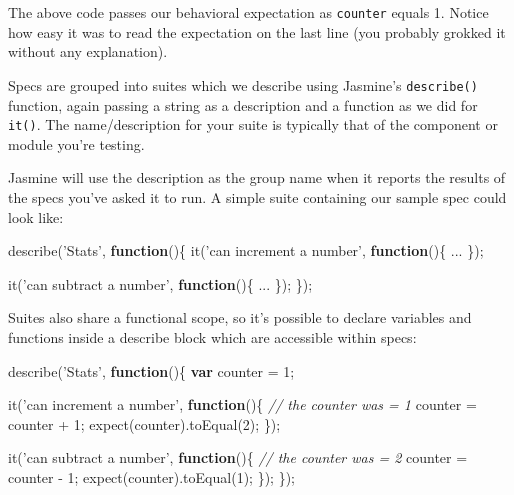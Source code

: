\documentclass[9pt]{book}
\newenvironment{Shaded}{}{}
\newcommand{\KeywordTok}[1]{\textcolor[rgb]{0.00,0.44,0.13}{\textbf{{#1}}}}
\newcommand{\DecValTok}[1]{\textcolor[rgb]{0.25,0.63,0.44}{{#1}}}
\newcommand{\StringTok}[1]{\textcolor[rgb]{0.25,0.44,0.63}{{#1}}}
\newcommand{\CommentTok}[1]{\textcolor[rgb]{0.38,0.63,0.69}{\textit{{#1}}}}
\newcommand{\FunctionTok}[1]{\textcolor[rgb]{0.02,0.16,0.49}{{#1}}}
\newcommand{\NormalTok}[1]{{#1}}
\begin{document}
The above code passes our behavioral expectation as \texttt{counter}
equals 1. Notice how easy it was to read the expectation on the last
line (you probably grokked it without any explanation).

Specs are grouped into suites which we describe using Jasmine's
\texttt{describe()} function, again passing a string as a description
and a function as we did for \texttt{it()}. The name/description for
your suite is typically that of the component or module you're testing.

Jasmine will use the description as the group name when it reports the
results of the specs you've asked it to run. A simple suite containing
our sample spec could look like:

\begin{Shaded}
\begin{Highlighting}[]
\FunctionTok{describe}\NormalTok{(}\StringTok{'Stats'}\NormalTok{, }\KeywordTok{function}\NormalTok{()\{}
    \FunctionTok{it}\NormalTok{(}\StringTok{'can increment a number'}\NormalTok{, }\KeywordTok{function}\NormalTok{()\{}
        \NormalTok{...}
    \NormalTok{\});}

    \FunctionTok{it}\NormalTok{(}\StringTok{'can subtract a number'}\NormalTok{, }\KeywordTok{function}\NormalTok{()\{}
        \NormalTok{...}
    \NormalTok{\});}
\NormalTok{\});}
\end{Highlighting}
\end{Shaded}

Suites also share a functional scope, so it's possible to declare
variables and functions inside a describe block which are accessible
within specs:

\begin{Shaded}
\begin{Highlighting}[]
\FunctionTok{describe}\NormalTok{(}\StringTok{'Stats'}\NormalTok{, }\KeywordTok{function}\NormalTok{()\{}
    \KeywordTok{var} \NormalTok{counter = }\DecValTok{1}\NormalTok{;}

    \FunctionTok{it}\NormalTok{(}\StringTok{'can increment a number'}\NormalTok{, }\KeywordTok{function}\NormalTok{()\{}
        \CommentTok{// the counter was = 1}
        \NormalTok{counter = counter + }\DecValTok{1}\NormalTok{;}
        \FunctionTok{expect}\NormalTok{(counter).}\FunctionTok{toEqual}\NormalTok{(}\DecValTok{2}\NormalTok{);}
    \NormalTok{\});}

    \FunctionTok{it}\NormalTok{(}\StringTok{'can subtract a number'}\NormalTok{, }\KeywordTok{function}\NormalTok{()\{}
        \CommentTok{// the counter was = 2}
        \NormalTok{counter = counter - }\DecValTok{1}\NormalTok{;}
        \FunctionTok{expect}\NormalTok{(counter).}\FunctionTok{toEqual}\NormalTok{(}\DecValTok{1}\NormalTok{);}
    \NormalTok{\});}
\NormalTok{\});}
\end{Highlighting}
\end{Shaded}
\end{document}
